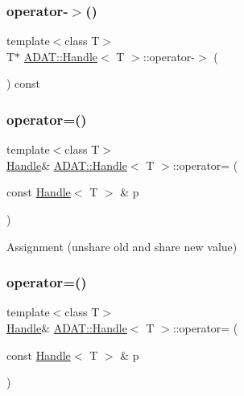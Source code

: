 \subsubsection{\texorpdfstring{operator-\/$>$()}{operator->()}\hspace{0.1cm}{\footnotesize\ttfamily [3/3]}}
{\footnotesize\ttfamily template$<$class T$>$ \\
T$\ast$ \mbox{\hyperlink{classADAT_1_1Handle}{A\+D\+A\+T\+::\+Handle}}$<$ T $>$\+::operator-\/$>$ (\begin{DoxyParamCaption}{ }\end{DoxyParamCaption}) const\hspace{0.3cm}{\ttfamily [inline]}}

\mbox{\label{classADAT_1_1Handle_a2d5773885c448de401319f9523742954}} 
\subsubsection{\texorpdfstring{operator=()}{operator=()}\hspace{0.1cm}{\footnotesize\ttfamily [1/3]}}
{\footnotesize\ttfamily template$<$class T$>$ \\
\mbox{\hyperlink{classADAT_1_1Handle}{Handle}}\& \mbox{\hyperlink{classADAT_1_1Handle}{A\+D\+A\+T\+::\+Handle}}$<$ T $>$\+::operator= (\begin{DoxyParamCaption}\item[{const \mbox{\hyperlink{classADAT_1_1Handle}{Handle}}$<$ T $>$ \&}]{p }\end{DoxyParamCaption})\hspace{0.3cm}{\ttfamily [inline]}}



Assignment (unshare old and share new value) 

\mbox{\label{classADAT_1_1Handle_a2d5773885c448de401319f9523742954}} 
\subsubsection{\texorpdfstring{operator=()}{operator=()}\hspace{0.1cm}{\footnotesize\ttfamily [2/3]}}
{\footnotesize\ttfamily template$<$class T$>$ \\
\mbox{\hyperlink{classADAT_1_1Handle}{Handle}}\& \mbox{\hyperlink{classADAT_1_1Handle}{A\+D\+A\+T\+::\+Handle}}$<$ T $>$\+::operator= (\begin{DoxyParamCaption}\item[{const \mbox{\hyperlink{classADAT_1_1Handle}{Handle}}$<$ T $>$ \&}]{p }\end{DoxyParamCaption})\hspace{0.3cm}{\ttfamily [inline]}}



